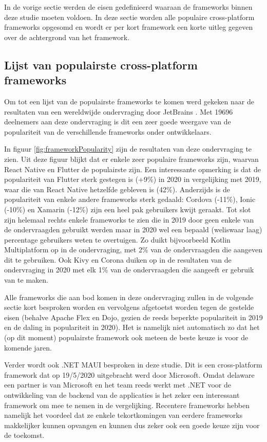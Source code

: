 In de vorige sectie werden de eisen gedefinieerd waaraan de frameworks binnen deze studie moeten voldoen. In deze sectie worden alle populaire cross-platform frameworks opgesomd en wordt er per kort framework een korte uitleg gegeven over de achtergrond van het framework.

\subsection{Lijst van populairste cross-platform frameworks}

Om tot een lijst van de populairste frameworks te komen werd gekeken naar de resultaten van een wereldwijde ondervraging door JetBrains \autocite{Liu2020}. Met 19696 deelnemers aan deze ondervraging is dit een zeer goede weergave van de populariteit van de verschillende frameworks onder ontwikkelaars.

In figuur \ref{fig:frameworkPopularity} zijn de resultaten van deze ondervraging te zien. Uit deze figuur blijkt dat er enkele zeer populaire frameworks zijn, waarvan React Native en Flutter de populairste zijn. Een interessante opmerking is dat de populariteit van Flutter sterk gestegen is (+9\%) in 2020 in vergelijking met 2019, waar die van React Native hetzelfde gebleven is (42\%). Anderzijds is de populariteit van enkele andere frameworks sterk gedaald: Cordova (-11\%), Ionic (-10\%) en Xamarin (-12\%) zijn een heel pak gebruikers kwijt geraakt. Tot slot zijn helemaal rechts enkele frameworks te zien die in 2019 door geen enkele van de ondervraagden gebruikt werden maar in 2020 wel een bepaald (weliswaar laag) percentage gebruikers weten te overtuigen. Zo duikt bijvoorbeeld Kotlin Multiplatform op in de ondervraging, met 2\% van de ondervraagden die aangeven dit te gebruiken. Ook Kivy en Corona duiken op in de resultaten van de ondervraging in 2020 met elk 1\% van de ondervraagden die aangeeft er gebruik van te maken.

Alle frameworks die aan bod komen in deze ondervraging zullen in de volgende sectie kort besproken worden en vervolgens afgetoetst worden tegen de gestelde eisen (behalve Apache Flex en Dojo, gezien de reeds beperkte populariteit in 2019 en de daling in populariteit in 2020). Het is namelijk niet automatisch zo dat het (op dit moment) populairste framework ook meteen de beste keuze is voor de komende jaren.

Verder wordt ook .NET MAUI besproken in deze studie. Dit is een cross-platform framework dat op 19/5/2020 uitgebracht werd door Microsoft. Omdat delaware een partner is van Microsoft en het team reeds werkt met .NET voor de ontwikkeling van de backend van de applicaties is het zeker een interessant framework om mee te nemen in de vergelijking. Recentere frameworks hebben namelijk het voordeel dat ze enkele tekortkomingen van eerdere frameworks makkelijker kunnen opvangen en kunnen dus zeker ook een goede keuze zijn voor de toekomst.

